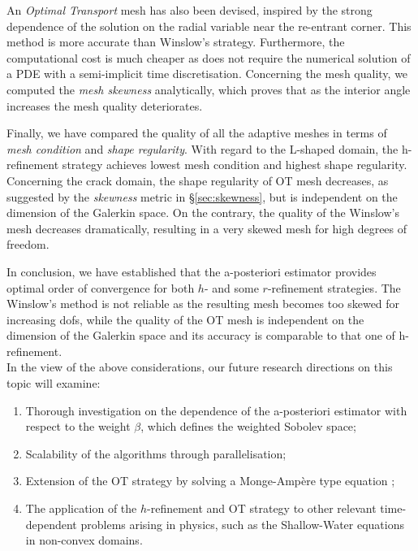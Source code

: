 \documentclass[a4paper,11pt]{article}
\begin{document}
An \textit{Optimal Transport} mesh has also been devised, inspired by the strong dependence of the solution on the radial variable near the re-entrant corner. This method is more accurate than Winslow's strategy. Furthermore, the computational cost is much cheaper as does not require the numerical solution of a PDE with a semi-implicit time discretisation. Concerning the mesh quality, we computed the \textit{mesh skewness} analytically, which proves that as the interior angle increases the mesh quality deteriorates. 


Finally, we have compared the quality of all the adaptive meshes in terms of \textit{mesh condition} and \textit{shape regularity}. With regard to the L-shaped domain, the h-refinement strategy achieves lowest mesh condition and highest shape regularity. Concerning the crack domain, the shape regularity of OT mesh decreases, as suggested by the \textit{skewness} metric in \S \ref{sec:skewness}, but is independent on the dimension of the Galerkin space. On the contrary, the quality of the Winslow's mesh decreases dramatically, resulting in a very skewed mesh for high degrees of freedom.

In conclusion, we have established that the a-posteriori estimator provides optimal order of convergence for both $h$- and some $r$-refinement strategies. The Winslow's method is not reliable as the resulting mesh becomes too skewed for increasing dofs, while the quality of the OT mesh is independent on the dimension of the Galerkin space and its accuracy is comparable to that one of h-refinement.\\

In the view of the above considerations, our future research directions on this topic will examine:

\begin{enumerate}
\item Thorough investigation on the dependence of the a-posteriori estimator with respect to the weight $\beta$, which defines the weighted Sobolev space;
\item Scalability of the algorithms through parallelisation;
\item Extension of the OT strategy by solving a Monge-Ampère type equation \cite{BRW:2015}; 
\item The application of the $h$-refinement and OT strategy to other relevant time-dependent problems arising in physics, such as the Shallow-Water equations in non-convex domains.
\end{enumerate}


\printbibliography
\end{document}
